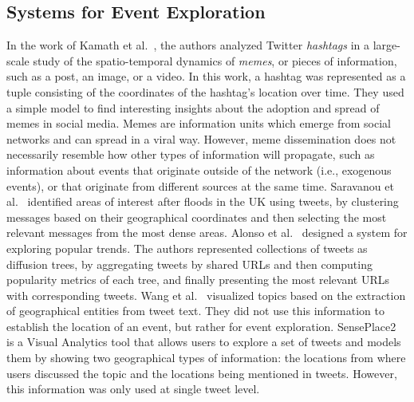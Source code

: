 \subsection{Systems for Event Exploration}
%
In the work of Kamath et al.~\cite{Kamath:2013:SDO:2488388.2488447}, the authors
analyzed Twitter \emph{hashtags} in a large-scale study of the spatio-temporal
dynamics of {\em memes}, or pieces of information, such as a post, an image, or
a video. 
%
In this work, a hashtag was represented as a tuple consisting of the coordinates
of the hashtag's location over time. 
%
They used a simple model to find interesting insights about the adoption and
spread of memes in social media. 
%
Memes are information units which emerge from social networks and can spread in
a viral way. 
%
However, meme dissemination does not necessarily resemble how other types of
information will propagate, such as information about events that originate
outside of the network (i.e., exogenous events), or that originate from
different sources at the same time.
%
Saravanou et al.~\cite{Saravanou:Twitter:2015} identified areas of interest
after floods in the UK using tweets, by clustering messages based on their
geographical coordinates and then selecting the most relevant messages from the
most dense areas.
%
Alonso et al.~\cite{Alonso:2017:WHH:3091478.3091484} designed a system for
exploring popular trends. 
%
The authors represented collections of tweets as diffusion trees, by
aggregating tweets by shared URLs and then computing popularity metrics of each
tree, and finally presenting the most relevant URLs with corresponding tweets.
%
Wang et al.~\cite{Wang:LeadLine:2012} visualized topics based on the extraction
of geographical entities from tweet text. 
%
They did not use this information to establish the location of an event, but
rather for event exploration.
%
SensePlace2~\cite{MacEachren:SensePlace2:2011} is a Visual Analytics tool that
allows users to explore a set of tweets and models them by showing two
geographical types of information: the locations from where users discussed the
topic and the locations being mentioned in tweets. 
%
However, this information was only used at single tweet level.



